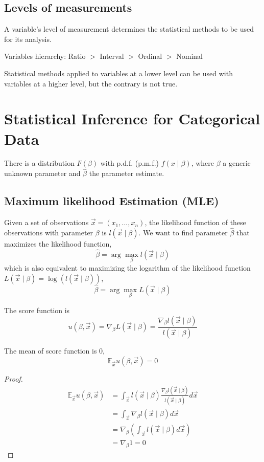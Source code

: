 \documentclass[11pt]{elegantbook}
\begin{document}
\subsection*{Levels of measurements}
A variable's level of measurement determines the statistical methods to be used for its analysis.
\begin{center}
    Variables hierarchy: Ratio $>$ Interval $>$ Ordinal $>$ Nominal
\end{center}
Statistical methods applied to variables at a lower level can be used with variables at a higher level, but the contrary is not true.

\section{Statistical Inference for Categorical Data}
There is a distribution $F(\beta)$ with p.d.f. (p.m.f.) $f(x\mid\beta)$, where $\beta$ a generic unknown parameter and $\hat{\beta}$ the parameter estimate.
\subsection{Maximum likelihood Estimation (MLE)}
Given a set of observations $\vec{x}=(x_1,...,x_n)$, the likelihood function of these observations with parameter $\beta$ is $l(\vec{x}\mid\beta)$. We want to find parameter $\hat{\beta}$ that maximizes the likelihood function,$$\hat{\beta}=\arg\max_{\beta} l(\vec{x}\mid\beta)$$
which is also equivalent to maximizing the logarithm of the likelihood function $L(\vec{x}\mid\beta) = \log(l(\vec{x}\mid\beta))$, $$\hat{\beta}=\arg\max_{\beta}L(\vec{x}\mid\beta)$$

\begin{definition}
    \normalfont
    The score function is $$u(\beta,\vec{x})=\nabla_{\beta} L(\vec{x}\mid \beta)=\frac{\nabla_{\beta} l(\vec{x}\mid \beta)}{l(\vec{x}\mid \beta)}$$
\end{definition}
\begin{lemma}
    The mean of score function is $0$,
    $$\mathbb{E}_{\vec{x}}u(\beta,\vec{x})=0$$
\end{lemma}
\begin{proof}
    \begin{equation}
        \begin{aligned}
            \mathbb{E}_{\vec{x}}u(\beta,\vec{x})&=\int_{\vec{x}}l(\vec{x}\mid \beta)\frac{\nabla_{\beta} l(\vec{x}\mid \beta)}{l(\vec{x}\mid \beta)}d \vec{x}\\
            &=\int_{\vec{x}}\nabla_{\beta} l(\vec{x}\mid \beta)d \vec{x}\\
            &=\nabla_{\beta}\left(\int_{\vec{x}}l(\vec{x}\mid \beta)d \vec{x}\right)\\
            &=\nabla_{\beta}1=0
        \end{aligned}
        \nonumber
    \end{equation}
\end{proof}
\end{document}
